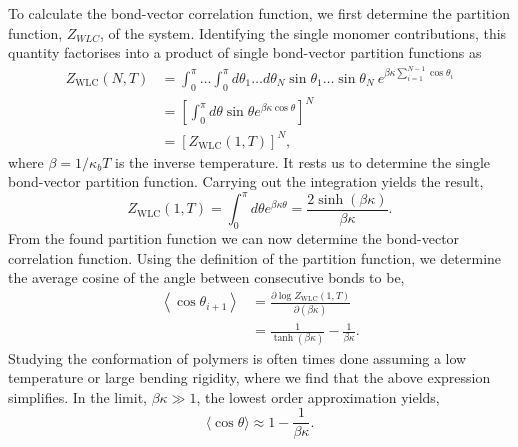 To calculate the bond-vector correlation function,  we first determine the partition
function, $Z_{WLC}$, of the system. Identifying the single monomer contributions, this
quantity factorises into a product of single bond-vector partition functions as
\begin{equation}
    \begin{aligned}
        \label{210}
        Z_{\mathrm{WLC}}(N, T)
        &= \int_{0}^{\pi}\dots \int_{0}^{\pi} d \theta_1 \dots d \theta_N \sin \theta_1 \dots
        \sin \theta_N\ e^{\beta \kappa \sum_{i=1}^{N-1} \cos\theta_i}\\
        &= \left[\int_{0}^{\pi} d \theta \sin \theta e^{\beta \kappa \cos
        \theta}\right]^{N}\\
        &= \left[Z_{\mathrm{WLC}}(1, T)\right]^{N},
    \end{aligned}
\end{equation}
where $\beta=1/\kappa_b T$ is the inverse temperature. It rests us to determine the
single bond-vector partition function. Carrying out the integration yields the result,
\begin{equation}
    Z_{\mathrm{WLC}}(1, T)=\int_{0}^{\pi} d \theta e^{\beta \kappa \theta}=\frac{2
    \sinh(\beta \kappa)}{\beta \kappa}.
\end{equation}
From the found partition function we can now determine the bond-vector correlation
function. Using the definition of the partition function, we determine the average cosine
of the angle between consecutive bonds to be,
\begin{equation}
    \begin{aligned}
    \left\langle\cos \theta_{i+1}\right\rangle
    &=\frac{\partial \log Z_{\mathrm{WLC}}(1, T)}{\partial(\beta \kappa)}\\
    &= \frac{1}{\tanh(\beta \kappa)} - \frac{1}{\beta \kappa}.
    \end{aligned}
\end{equation}
Studying the conformation of polymers is often times done assuming a low
temperature or large bending rigidity, where we find
that the above expression simplifies. In the limit, $\beta \kappa \gg 1$, the lowest
order approximation yields,
\begin{equation}
    \langle\cos \theta\rangle \approx 1-\frac{1}{\beta \kappa}.
\end{equation}
